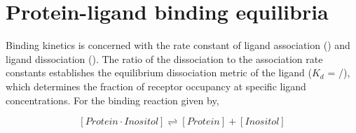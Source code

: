 
\section{Protein-ligand binding equilibria}





Binding kinetics is concerned with the rate constant of ligand association (\kon) and ligand dissociation (\koff). The ratio of the dissociation to the association rate constants establishes the equilibrium dissociation metric of the ligand ($K_{d}$ = \koff/\kon), which determines the fraction of receptor occupancy at specific ligand concentrations. For the binding reaction given by,

\begin{equation}
\left[ Protein\cdot Inositol \right] \rightleftharpoons \left[ Protein \right]+\left[ Inositol \right]
\end{equation}
 
